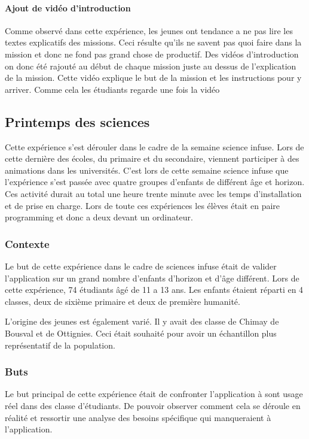 \paragraph{Ajout de vidéo d'introduction}
Comme observé dans cette expérience, les jeunes ont tendance a ne pas lire les textes explicatifs des missions. Ceci résulte qu'ils ne savent pas quoi faire dans la mission et donc ne fond pas grand chose de productif. Des vidéos d'introduction on donc été rajouté au début de chaque mission juste au dessus de l'explication de la mission. Cette vidéo explique le but de la mission et les instructions pour y arriver. Comme cela les étudiants regarde une fois la vidéo 


\subsection{Printemps des sciences}
Cette expérience s'est dérouler dans le cadre de la semaine science infuse. Lors de cette dernière des écoles, du primaire et du secondaire, viennent participer à des animations dans les universités. C'est lors de cette semaine science infuse que l'expérience s'est passée avec quatre groupes d'enfants de différent âge et horizon. Ces activité durait au total une heure trente minute avec les temps d'installation et de prise en charge. Lors de toute ces expériences les élèves était en paire programming et donc a deux devant un ordinateur.

\subsubsection{Contexte}
Le but de cette expérience dans le cadre de sciences infuse était de valider l'application sur un grand nombre d'enfants d'horizon et d'âge différent. Lors de cette expérience, 74 étudiants âgé de 11 a 13 ans. Les enfants étaient réparti en 4 classes, deux de sixième primaire et deux de première humanité.

L'origine des jeunes est également varié. Il y avait des classe de Chimay de Bousval et de Ottignies. Ceci était souhaité pour avoir un échantillon plus représentatif de la population.

\subsubsection{Buts}
Le but principal de cette expérience était de confronter l'application à sont usage réel dans des classe d'étudiants. De pouvoir observer comment cela se déroule en réalité et ressortir une analyse des besoins spécifique qui manqueraient à l'application.

